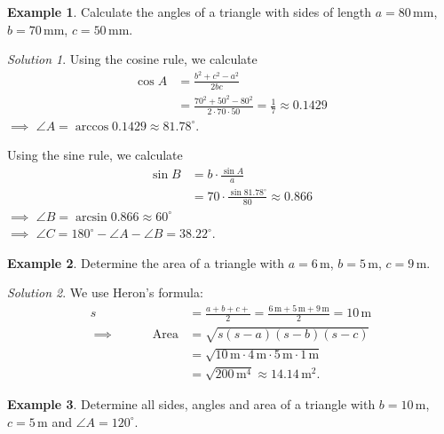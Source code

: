 \documentclass[
  12pt,
  oneside]{book}
\theoremstyle{definition}
\theoremstyle{definition}
\newtheorem{example}{Example}[chapter]
\theoremstyle{definition}
\theoremstyle{definition}
\theoremstyle{remark}
\newtheorem*{solution}{Solution}
\begin{document}
\begin{example}
Calculate the angles of a triangle with sides of length \(a=80\,\mathrm{mm}\), \(b=70\,\mathrm{mm}\), \(c=50\,\mathrm{mm}\).
\end{example}

\begin{solution}
Using the cosine rule, we calculate
\begin{align*}
\cos A &= \frac{b^2+c^2-a^2}{2bc}\\
&= \frac{70^2+50^2-80^2}{2\cdot70\cdot50} =\frac{1}{7} \approx 0.1429
\end{align*}
\(\implies\) \(\angle A = \arccos 0.1429 \approx 81.78^\circ\).

Using the sine rule, we calculate
\begin{align*}
\sin B &= b\cdot \frac{\sin A}{a}\\
&= 70 \cdot \frac{\sin 81.78^\circ}{80} \approx 0.866
\end{align*}
\(\implies\) \(\angle B=\arcsin 0.866 \approx 60^\circ\)\\
\(\implies\) \(\angle C = 180^\circ-\angle A-\angle B= 38.22^\circ\).
\end{solution}

\begin{example}
Determine the area of a triangle with \(a=6\,\mathrm{m}\), \(b=5\,\mathrm{m}\), \(c=9\,\mathrm{m}\).
\end{example}

\begin{solution}
We use Heron's formula:
\begin{align*}
s&=\frac{a+b+c+}{2}=\frac{6\,\mathrm{m} + 5\,\mathrm{m}+ 9\,\mathrm{m}}{2}=10\,\mathrm{m}\\
\implies\quad\quad\quad\mathrm{Area} &= \sqrt{s(s-a)(s-b)(s-c)}\\
&= \sqrt{10\,\mathrm{m}\cdot 4\,\mathrm{m}\cdot 5\,\mathrm{m}\cdot 1\,\mathrm{m}} \\
&= \sqrt{200\,\mathrm{m^4}} \approx 14.14\,\mathrm{m^2}.
\end{align*}
\end{solution}

\begin{example}
Determine all sides, angles and area of a triangle with \(b=10\,\mathrm{m}\), \(c=5\,\mathrm{m}\) and \(\angle A=120^\circ\).
\end{example}
\end{document}
